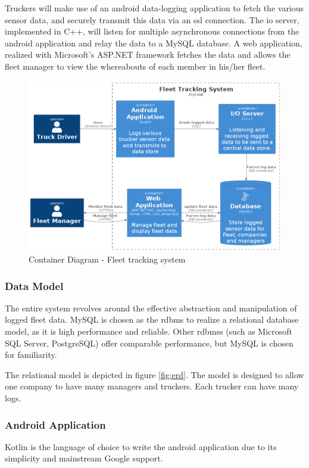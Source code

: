 Truckers will make use of an android data-logging application to fetch the various sensor data, and securely transmit this data via an \ac{ssl} connection.
The \ac{io} server, implemented in C++, will listen for multiple asynchronous connections from the android application and relay the data to a MySQL database.
A web application, realized with Microsoft's ASP.NET framework fetches the data and allows the fleet manager to view the whereabouts of each member in his/her fleet.
\begin{figure}[H]
\centering
\includegraphics[width=6in]{../diag/container.png}
\caption{Container Diagram - Fleet tracking system}
\label{fig:container}
\end{figure}

\subsubsection{Data Model}
The entire system revolves around the effective abstraction and manipulation of logged fleet data.
MySQL is chosen as the \ac{rdbms} to realize a relational database model, as it is high performance and reliable.
Other \ac{rdbms}s (such as Microsoft SQL Server, PostgreSQL) offer comparable performance, but MySQL is chosen for familiarity.

The relational model is depicted in figure \ref{fig:erd}.
The model is designed to allow one company to have many managers and truckers. Each trucker can have many logs.

\subsubsection{Android Application}
Kotlin is the language of choice to write the android application due to its simplicity and mainstream Google support.

